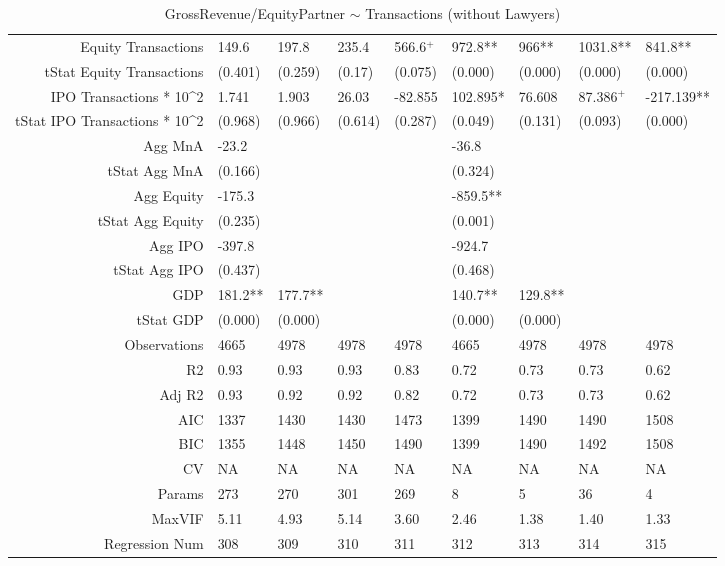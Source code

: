 \begin{table}[ht]
\begin{tabular}{rllllllll}
  Equity Transactions & 149.6 & 197.8 & 235.4 & 566.6$^{+}$ & 972.8** & 966** & 1031.8** & 841.8** \\ 
  tStat Equity Transactions & (0.401) & (0.259) & (0.17) & (0.075) & (0.000) & (0.000) & (0.000) & (0.000) \\ 
  IPO Transactions * 10^2 & 1.741 & 1.903 & 26.03 & -82.855 & 102.895* & 76.608 & 87.386$^{+}$ & -217.139** \\ 
  tStat IPO Transactions * 10^2 & (0.968) & (0.966) & (0.614) & (0.287) & (0.049) & (0.131) & (0.093) & (0.000) \\ 
  Agg MnA & -23.2 &  &  &  & -36.8 &  &  &  \\ 
  tStat Agg MnA & (0.166) &  &  &  & (0.324) &  &  &  \\ 
  Agg Equity & -175.3 &  &  &  & -859.5** &  &  &  \\ 
  tStat Agg Equity & (0.235) &  &  &  & (0.001) &  &  &  \\ 
  Agg IPO & -397.8 &  &  &  & -924.7 &  &  &  \\ 
  tStat Agg IPO & (0.437) &  &  &  & (0.468) &  &  &  \\ 
  GDP & 181.2** & 177.7** &  &  & 140.7** & 129.8** &  &  \\ 
  tStat GDP & (0.000) & (0.000) &  &  & (0.000) & (0.000) &  &  \\ 
  Observations & 4665 & 4978 & 4978 & 4978 & 4665 & 4978 & 4978 & 4978 \\ 
  R2 & 0.93 & 0.93 & 0.93 & 0.83 & 0.72 & 0.73 & 0.73 & 0.62 \\ 
  Adj R2 & 0.93 & 0.92 & 0.92 & 0.82 & 0.72 & 0.73 & 0.73 & 0.62 \\ 
  AIC & 1337 & 1430 & 1430 & 1473 & 1399 & 1490 & 1490 & 1508 \\ 
  BIC & 1355 & 1448 & 1450 & 1490 & 1399 & 1490 & 1492 & 1508 \\ 
  CV & NA & NA & NA & NA & NA & NA & NA & NA \\ 
  Params & 273 & 270 & 301 & 269 & 8 & 5 & 36 & 4 \\ 
  MaxVIF & 5.11 & 4.93 & 5.14 & 3.60 & 2.46 & 1.38 & 1.40 & 1.33 \\ 
  Regression Num & 308 & 309 & 310 & 311 & 312 & 313 & 314 & 315 \\ 
   \hline
\end{tabular}
\caption{GrossRevenue/EquityPartner $\sim$ Transactions (without Lawyers)} 
\end{table}
